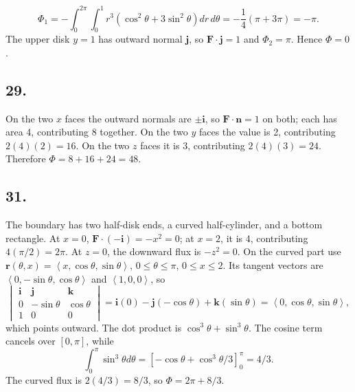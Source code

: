 \documentclass[11pt]{article}
\newcommand{\ex}[1]{\subsection*{#1.}}
\newcommand{\ans}[1]{\boxed{#1}}
\newcommand{\vv}[1]{\left\langle #1\right\rangle}
\newcommand{\ii}{\mathbf i}\newcommand{\jj}{\mathbf j}\newcommand{\kk}{\mathbf k}
\newcommand{\cp}[6]{\begin{vmatrix}\ii&\jj&\kk\\#1&#2&#3\\#4&#5&#6\end{vmatrix}}
\begin{document}
\[\Phi_1=-\int_0^{2\pi}\int_0^1r^3(\cos^2\theta+3\sin^2\theta)dr\,d\theta
=-\frac14(\pi+3\pi)=-\pi.\]
The upper disk $y=1$ has outward normal $\jj$, so $\mathbf F\cdot\jj=1$ and $\Phi_2=\pi$. Hence $\ans{\Phi=0}$.
\ex{29}
On the two $x$ faces the outward normals are $\pm\ii$, so $\mathbf F\cdot\mathbf n=1$ on both; each has area 4, contributing 8 together. On the two $y$ faces the value is 2, contributing $2(4)(2)=16$. On the two $z$ faces it is 3, contributing $2(4)(3)=24$. Therefore $\ans{\Phi=8+16+24=48}$.
\ex{31}
The boundary has two half-disk ends, a curved half-cylinder, and a bottom rectangle. At $x=0$, $\mathbf F\cdot(-\ii)=-x^2=0$; at $x=2$, it is 4, contributing $4(\pi/2)=2\pi$. At $z=0$, the downward flux is $-z^2=0$.
On the curved part use $\mathbf r(\theta,x)=\vv{x,\cos\theta,\sin\theta}$, $0\le\theta\le\pi$, $0\le x\le2$. Its tangent vectors are $\vv{0,-\sin\theta,\cos\theta}$ and $\vv{1,0,0}$, so
\[\cp{0}{-\sin\theta}{\cos\theta}{1}{0}{0}
=\ii(0)-\jj(-\cos\theta)+\kk(\sin\theta)=\vv{0,\cos\theta,\sin\theta},\]
which points outward. The dot product is $\cos^3\theta+\sin^3\theta$. The cosine term cancels over $[0,\pi]$, while
\[\int_0^\pi\sin^3\theta d\theta=[-\cos\theta+\cos^3\theta/3]_0^\pi=4/3.\]
The curved flux is $2(4/3)=8/3$, so $\ans{\Phi=2\pi+8/3}$.
\end{document}
